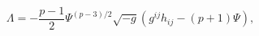 \begin{equation}
{\Lambda}=-\frac{p-1}{2}{\Psi}^{(p-3)/2}\sqrt{-g}\left(g^{ij}h_{ij}
-(p+1){\Psi}\right),
\end{equation}

